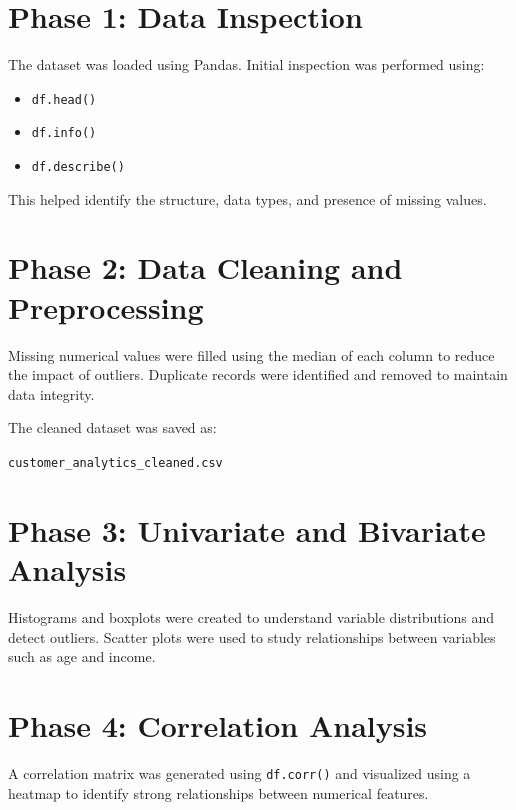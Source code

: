 \documentclass[12pt]{article}
\begin{document}
	\section{Phase 1: Data Inspection}
	
	The dataset was loaded using Pandas. Initial inspection was performed using:
	
	\begin{itemize}[leftmargin=1.5cm]
		\item \texttt{df.head()}
		\item \texttt{df.info()}
		\item \texttt{df.describe()}
	\end{itemize}
	
	This helped identify the structure, data types, and presence of missing values.
	
	\section{Phase 2: Data Cleaning and Preprocessing}
	
	Missing numerical values were filled using the median of each column to reduce the impact of outliers. Duplicate records were identified and removed to maintain data integrity.
	
	The cleaned dataset was saved as:
	
	\texttt{customer\_analytics\_cleaned.csv}
	
	\section{Phase 3: Univariate and Bivariate Analysis}
	
	Histograms and boxplots were created to understand variable distributions and detect outliers. Scatter plots were used to study relationships between variables such as age and income.
	
	\section{Phase 4: Correlation Analysis}
	
	A correlation matrix was generated using \texttt{df.corr()} and visualized using a heatmap to identify strong relationships between numerical features.
	
\end{document}
